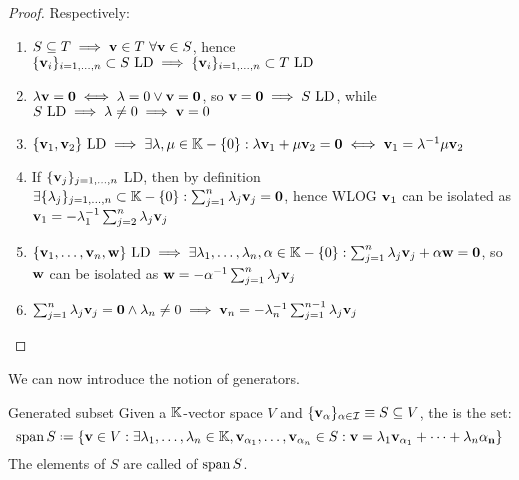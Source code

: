 \begin{proofbox}
  \begin{proof}
    Respectively:
    \begin{enumerate}[label = {\alph*.}]
      \item $ S \subseteq T \implies \mathbf{v} \in T \,\,\forall \mathbf{v} \in S $, hence $ \{\mathbf{v}_i\}_{i = 1, \dots, n} \subset S \text{ LD} \implies \{\mathbf{v}_i\}_{i = 1, \dots, n} \subset T \text{ LD} $
      \item $ \lambda \mathbf{v} = \mathbf{0} \iff \lambda = 0 \lor \mathbf{v} = \mathbf{0} $, so $ \mathbf{v} = \mathbf{0} \implies S \text{ LD} $, while $ S \text{ LD} \implies \lambda \neq 0 \implies \mathbf{v} = 0 $
      \item $ \{\mathbf{v}_1 , \mathbf{v}_2\} \text{ LD} \implies \exists \lambda , \mu \in \mathbb{K} - \{0\} : \lambda \mathbf{v}_1 + \mu \mathbf{v}_2 = \mathbf{0} \iff \mathbf{v}_1 = \lambda^{-1} \mu \mathbf{v}_2 $
      \item If $ \{\mathbf{v}_j\}_{j = 1, \dots, n} $ LD, then by definition $ \exists \{\lambda_j\}_{j = 1, \dots, n} \subset \mathbb{K} - \{0\} : \sum_{j = 1}^n \lambda_j \mathbf{v}_j = \mathbf{0} $, hence WLOG $ \mathbf{v}_1 $ can be isolated as $ \mathbf{v}_1 = - \lambda_1^{-1} \sum_{j = 2}^n \lambda_j \mathbf{v}_j $
      \item $ \{\mathbf{v}_1 , \dots , \mathbf{v}_n , \mathbf{w}\} \text{ LD} \implies \exists \lambda_1 , \dots , \lambda_n , \alpha \in \mathbb{K} - \{0\} : \sum_{j = 1}^n \lambda_j \mathbf{v}_j + \alpha \mathbf{w} = \mathbf{0} $, so $ \mathbf{w} $ can be isolated as $ \mathbf{w} = - \alpha^{-1} \sum_{j = 1}^n \lambda_j \mathbf{v}_j $
      \item $ \sum_{j = 1}^n \lambda_j \mathbf{v}_j = \mathbf{0} \land \lambda_n \neq 0 \implies \mathbf{v}_n = - \lambda_n^{-1} \sum_{j = 1}^{n-1} \lambda_j \mathbf{v}_j $
    \end{enumerate}
  \end{proof}
\end{proofbox}

We can now introduce the notion of generators.

\begin{definition}{Generated subset}{}
  Given a $ \mathbb{K} $-vector space $ V $ and $ \{\mathbf{v}_\alpha\}_{\alpha \in \mathcal{I}} \equiv S \subseteq V $, the  is the set:
  \begin{equation*}
    \lspan{S} \defeq \{\ve{v} \in V : \exists \lambda_1 , \dots , \lambda_n \in \K, \ve{v}_{\alpha_1} , \dots , \ve{v}_{\alpha_n} \in S : \ve{v} = \lambda_1 \ve{v}_{\alpha_1} + \dots + \lambda_n \ve{\alpha_n}\}
  \end{equation*}
  The elements of $ S $ are called  of $ \operatorname{span}{S} $.
\end{definition}

